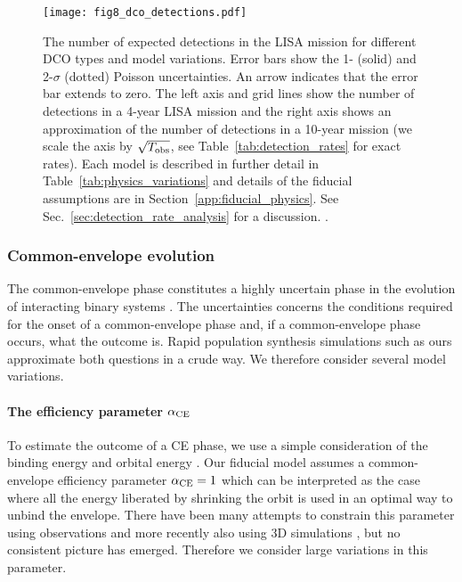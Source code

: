 \begin{figure*}[p]
    \centering
    \texttt{[image: fig8\_dco\_detections.pdf]}
    \caption{The number of expected detections in the LISA mission for different DCO types and model variations. Error bars show the 1- (solid) and 2-$\sigma$ (dotted) Poisson uncertainties. An arrow indicates that the error bar extends to zero. The left axis and grid lines show the number of detections in a 4-year LISA mission and the right axis shows an approximation of the number of detections in a 10-year mission (we scale the axis by $\sqrt{T_{\rm obs}}$, see Table~\ref{tab:detection_rates} for exact rates). Each model is described in further detail in Table~\ref{tab:physics_variations} and details of the fiducial assumptions are in Section~\ref{app:fiducial_physics}. See Sec.~\ref{sec:detection_rate_analysis} for a discussion. \href{https://github.com/TomWagg/detecting-DCOs-in-LISA/blob/main/paper/figures/fig8_dco_detections.pdf}{\faFileImage} \href{https://github.com/TomWagg/detecting-DCOs-in-LISA/blob/main/paper/figure_notebooks/detections.ipynb}{\faBook}.}
    \label{fig:detection_rates}
\end{figure*}

\subsubsection{Common-envelope evolution}\label{sec:detection_rate_CE_trends}

The common-envelope phase constitutes a highly uncertain phase in the evolution of interacting binary systems \citep[e.g.][]{Ivanova+2013}. The uncertainties concerns the conditions required for the onset of a common-envelope phase and, if a common-envelope phase occurs, what the outcome is. Rapid population synthesis simulations such as ours approximate both questions in a crude way. We therefore consider several model variations. 

\paragraph{The efficiency parameter $\alpha_{\rm CE}$} To estimate the outcome of a CE phase, we use a simple consideration of the binding energy and orbital energy \citep{Webbink+1984, deKool+1990}. Our fiducial model assumes a common-envelope efficiency parameter $\alpha_{\rm CE} = 1$ which can be interpreted as the case where all the energy liberated by shrinking the orbit is used in an optimal way to unbind the envelope. There have been many attempts to constrain this parameter using observations and more recently also using 3D simulations \citep[e.g.][]{DeMarco+2011, Law-Smith+2020, Lau+2021}, but no consistent picture has emerged. Therefore we consider large variations in this parameter. 

